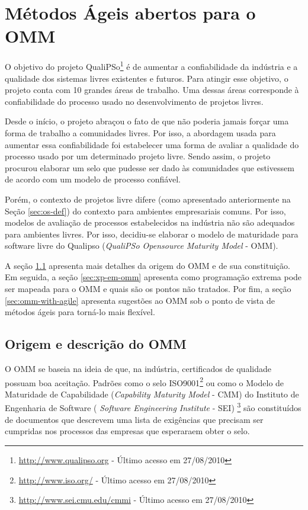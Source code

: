 \chapter{Métodos Ágeis abertos para o OMM}
\label{cap:omm}

O objetivo do projeto QualiPSo\footnote{\url{http://www.qualipso.org}
  - Último acesso em 27/08/2010} é de aumentar a confiabilidade da
indústria e a qualidade dos sistemas livres existentes e futuros. Para
atingir esse objetivo, o projeto conta com 10 grandes áreas de
trabalho. Uma dessas áreas corresponde à confiabilidade do processo
usado no desenvolvimento de projetos livres.

Desde o início, o projeto abraçou o fato de que não poderia jamais
forçar uma forma de trabalho a comunidades livres. Por isso, a
abordagem usada para aumentar essa confiabilidade foi estabelecer uma
forma de avaliar a qualidade do processo usado por um determinado
projeto livre. Sendo assim, o projeto procurou elaborar um selo que
pudesse ser dado às comunidades que estivessem de acordo com um modelo
de processo confiável.

Porém, o contexto de projetos livre difere (como apresentado
anteriormente na Seção \ref{sec:os-def}) do contexto para ambientes
empresariais comuns. Por isso, modelos de avaliação de processos
estabelecidos na indústria não são adequados para ambientes
livres. Por isso, decidiu-se elaborar o modelo de maturidade para
software livre do Qualipso (\textit{QualiPSo Opensource Maturity
  Model} - OMM).

A seção \ref{sec:o-que-eh-omm} apresenta mais detalhes da origem do
OMM e de sua constituição. Em seguida, a seção \ref{sec:xp-em-omm}
apresenta como programação extrema pode ser mapeada para o OMM e quais
são os pontos não tratados. Por fim, a seção
\ref{sec:omm-with-agile} apresenta sugestões ao OMM sob o ponto de
vista de métodos ágeis para torná-lo mais flexível.

\section{Origem e descrição do OMM}
\label{sec:o-que-eh-omm}

O OMM se baseia na ideia de que, na indústria, certificados de
qualidade possuam boa aceitação. Padrões como o selo
ISO9001\footnote{\url{http://www.iso.org/} - Último acesso em
  27/08/2010} ou como o Modelo de Maturidade de Capabilidade
(\textit{Capability Maturity Model} - CMM) do Instituto de Engenharia
de Software ( \textit{Software Engineering Institute} - SEI)
\footnote{\url{http://www.sei.cmu.edu/cmmi} - Último acesso em
  27/08/2010} são constituídos de documentos que descrevem uma lista
de exigências que precisam ser cumpridas nos processos das empresas
que esperaraem obter o selo.

